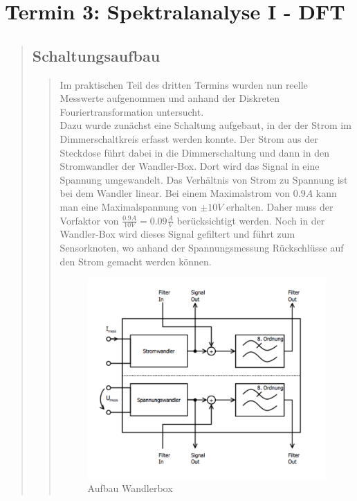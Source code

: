 \section{Termin 3: Spektralanalyse I - DFT}
\begin{quote}

	\subsection{Schaltungsaufbau}
	\begin{quote}
	Im praktischen Teil des dritten Termins wurden nun reelle Messwerte aufgenommen
	und anhand der Diskreten Fouriertransformation untersucht.\\
	Dazu wurde zunächst eine Schaltung aufgebaut, in der der Strom im
	Dimmerschaltkreis erfasst werden konnte. Der Strom aus der Steckdose führt
	dabei in die Dimmerschaltung und dann in den Stromwandler der Wandler-Box. Dort
	wird das Signal in eine Spannung umgewandelt. Das Verhältnis von Strom zu
	Spannung ist bei dem Wandler linear. Bei einem Maximalstrom von $0.9 A$ kann
	man eine Maximalspannung von $\pm 10 V$ erhalten. Daher muss der Vorfaktor von
	$\frac{0.9 A}{10 V} = 0.09 \frac{A}{V}$ berücksichtigt werden. Noch in der
	Wandler-Box wird dieses Signal gefiltert und führt zum Sensorknoten, wo anhand
	der Spannungsmessung Rückschlüsse auf den Strom gemacht werden können.
	
	\begin{figure}[H]
    \centering
        \includegraphics[scale=0.7, trim = 0cm 0cm 0cm 0cm, clip]{./Bilder/Schaltungwandlerbox}
            \caption{Aufbau Wandlerbox}
    \end{figure}
    

\end{quote}
\end{quote}
